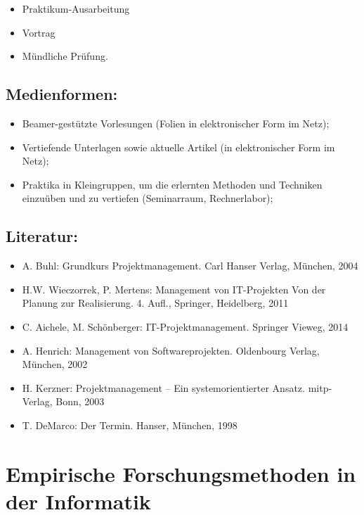 \begin{itemize}
\tightlist
\item
  Praktikum-Ausarbeitung
\item
  Vortrag
\item
  Mündliche Prüfung.
\end{itemize}

\section{Medienformen:}\label{medienformen-20}

\begin{itemize}
\tightlist
\item
  Beamer-gestützte Vorlesungen (Folien in elektronischer Form im Netz);
\item
  Vertiefende Unterlagen sowie aktuelle Artikel (in elektronischer Form
  im Netz);
\item
  Praktika in Kleingruppen, um die erlernten Methoden und Techniken
  einzuüben und zu vertiefen (Seminarraum, Rechnerlabor);
\end{itemize}

\section{Literatur:}\label{literatur-20}

\begin{itemize}
\tightlist
\item
  A. Buhl: Grundkurs Projektmanagement. Carl Hanser Verlag, München,
  2004
\item
  H.W. Wieczorrek, P. Mertens: Management von IT-Projekten Von der
  Planung zur Realisierung. 4. Aufl., Springer, Heidelberg, 2011
\item
  C. Aichele, M. Schönberger: IT-Projektmanagement. Springer Vieweg,
  2014
\item
  A. Henrich: Management von Softwareprojekten. Oldenbourg Verlag,
  München, 2002
\item
  H. Kerzner: Projektmanagement -- Ein systemorientierter Ansatz.
  mitp-Verlag, Bonn, 2003
\item
  T. DeMarco: Der Termin. Hanser, München, 1998
\end{itemize}

\chapter{Empirische Forschungsmethoden in der
Informatik}\label{empirische-forschungsmethoden-in-der-informatik}

